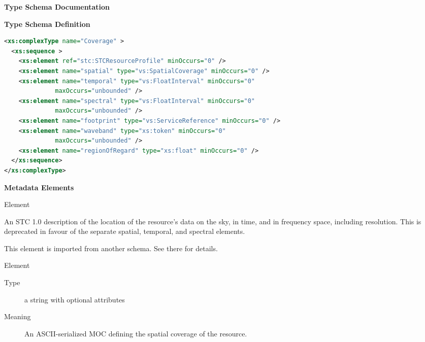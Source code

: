 \documentclass[11pt,a4paper]{ivoa}
\begin{document}
\begin{generated}
\begingroup
        \renewcommand*\descriptionlabel[1]{%
        \hbox to 5.5em{\emph{#1}\hfil}}\vspace{2ex}\noindent\textbf{ Type Schema Documentation}


\vspace{1ex}\noindent\textbf{ Type Schema Definition}

\begin{lstlisting}[language=XML,basicstyle=\footnotesize]
<xs:complexType name="Coverage" >
  <xs:sequence >
    <xs:element ref="stc:STCResourceProfile" minOccurs="0" />
    <xs:element name="spatial" type="vs:SpatialCoverage" minOccurs="0" />
    <xs:element name="temporal" type="vs:FloatInterval" minOccurs="0"
              maxOccurs="unbounded" />
    <xs:element name="spectral" type="vs:FloatInterval" minOccurs="0"
              maxOccurs="unbounded" />
    <xs:element name="footprint" type="vs:ServiceReference" minOccurs="0" />
    <xs:element name="waveband" type="xs:token" minOccurs="0"
              maxOccurs="unbounded" />
    <xs:element name="regionOfRegard" type="xs:float" minOccurs="0" />
  </xs:sequence>
</xs:complexType>
\end{lstlisting}

\vspace{0.5ex}\noindent\textbf{ Metadata Elements}

\begingroup\small\begin{bigdescription}\item[Element \xmlel{stc:STCResourceProfile}]

                 An STC 1.0 description of the location of the resource's
                 data on the sky, in time, and in frequency space,
                 including resolution.   This is deprecated in favour
                 of the separate spatial, temporal, and spectral elements.


This element is imported from another schema.  See
            there for details.\item[Element \xmlel{spatial}]
\begin{description}
\item[Type] a string with optional attributes
\item[Meaning]
                  An ASCII-serialized MOC defining the spatial coverage
                  of the resource.


\end{description}
\end{bigdescription}
\end{generated}
\end{document}
